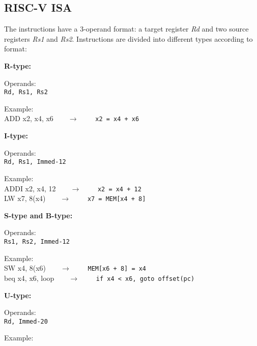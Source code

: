\subsection{RISC-V ISA}
The instructions have a 3-operand format: a target register \textit{Rd} and two source registers \textit{Rs1} and \textit{Rs2}. Instructions are divided into different types according to format:\\

\begin{description}
	\item \textbf{R-type:}
	\begin{description}
		\item Operands:\\
		\texttt{Rd, Rs1, Rs2}
		\item Example:\\
		\textsf{ADD x2, x4, x6}\ \ \ \ $\longrightarrow$ \ \ \ \ \texttt{x2 = x4 + x6}
	\end{description}
	\item \textbf{I-type:}
	\begin{description}
		\item Operands:\\
		\texttt{Rd, Rs1, Immed-12}
		\item Example:\\
		\textsf{ADDI x2, x4, 12}\ \ \ \ $\longrightarrow$ \ \ \ \ \texttt{x2 = x4 + 12}\\
		\textsf{LW x7, 8(x4)}\ \ \ \ $\longrightarrow$ \ \ \ \ \texttt{x7 = MEM[x4 + 8]}
	\end{description}
	\item \textbf{S-type and B-type:}
	\begin{description}
		\item Operands:\\
		\texttt{Rs1, Rs2, Immed-12}
		\item Example:\\
		\textsf{SW x4, 8(x6)}\ \ \ \ $\longrightarrow$ \ \ \ \ \texttt{MEM[x6 + 8] = x4}\\
		\textsf{beq x4, x6, loop}\ \ \ \ $\longrightarrow$ \ \ \ \ \texttt{if x4 < x6, goto offset(pc)}
	\end{description}
	\item \textbf{U-type:}
	\begin{description}
		\item Operands:\\
		\texttt{Rd, Immed-20}
		\item Example:\\

\end{description}
\end{description}
